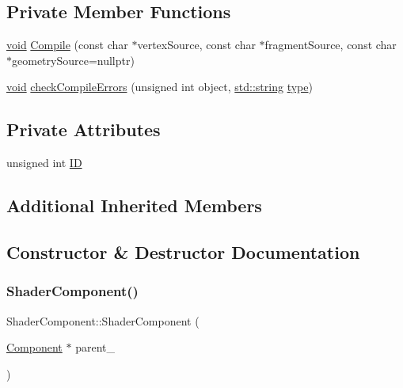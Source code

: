 \subsection*{Private Member Functions}
\begin{DoxyCompactItemize}
\item 
\hyperlink{imgui__impl__opengl3__loader_8h_ac668e7cffd9e2e9cfee428b9b2f34fa7}{void} \hyperlink{classShaderComponent_a157e28adca7dc3a8bd978162d45746ba}{Compile} (const char $\ast$vertex\+Source, const char $\ast$fragment\+Source, const char $\ast$geometry\+Source=nullptr)
\item 
\hyperlink{imgui__impl__opengl3__loader_8h_ac668e7cffd9e2e9cfee428b9b2f34fa7}{void} \hyperlink{classShaderComponent_a92f704bba9b4bb0cc0375126345c8295}{check\+Compile\+Errors} (unsigned int object, \hyperlink{imgui__impl__opengl3__loader_8h_ac83513893df92266f79a515488701770}{std\+::string} \hyperlink{imgui__impl__opengl3__loader_8h_a63267399cd2a2ee217572c11d2e54f07}{type})
\end{DoxyCompactItemize}
\subsection*{Private Attributes}
\begin{DoxyCompactItemize}
\item 
unsigned int \hyperlink{classShaderComponent_a86e364d55d966ff81256f54bfe061fae}{ID}
\end{DoxyCompactItemize}
\subsection*{Additional Inherited Members}


\subsection{Constructor \& Destructor Documentation}
\mbox{\label{classShaderComponent_a85854a674af6364cf113117964a07170}} 
\subsubsection{\texorpdfstring{Shader\+Component()}{ShaderComponent()}}
{\footnotesize\ttfamily Shader\+Component\+::\+Shader\+Component (\begin{DoxyParamCaption}\item[{\hyperlink{classComponent}{Component} $\ast$}]{parent\+\_\+ }\end{DoxyParamCaption})}

